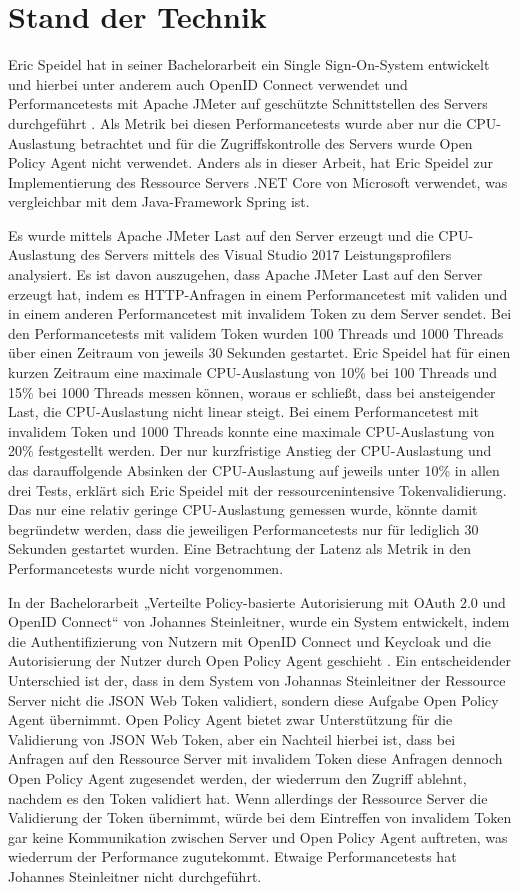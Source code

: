 \chapter{Stand der Technik}
Eric Speidel hat in seiner Bachelorarbeit ein Single Sign-On-System entwickelt und hierbei unter anderem auch OpenID Connect verwendet und Performancetests mit Apache JMeter auf geschützte Schnittstellen des Servers durchgeführt \citep{speidel:2017}. Als Metrik bei diesen Performancetests wurde aber nur die CPU-Auslastung betrachtet und für die Zugriffskontrolle des Servers wurde Open Policy Agent nicht verwendet. Anders als in dieser Arbeit, hat Eric Speidel zur Implementierung des Ressource Servers .NET Core von Microsoft verwendet, was vergleichbar mit dem Java-Framework Spring ist.\smallskip

Es wurde mittels Apache JMeter Last auf den Server erzeugt und die CPU-Auslastung des Servers mittels des Visual Studio 2017 Leistungsprofilers analysiert. Es ist davon auszugehen, dass Apache JMeter Last auf den Server erzeugt hat, indem es HTTP-Anfragen in einem Performancetest mit validen und in einem anderen Performancetest mit invalidem Token zu dem Server sendet. Bei den Performancetests mit validem Token wurden 100 Threads und 1000 Threads über einen Zeitraum von jeweils 30 Sekunden gestartet. Eric Speidel hat für einen kurzen Zeitraum eine maximale CPU-Auslastung von 10\% bei 100 Threads und 15\% bei 1000 Threads messen können, woraus er schließt, dass bei ansteigender Last, die CPU-Auslastung nicht linear steigt. Bei einem Performancetest mit invalidem Token und 1000 Threads konnte eine maximale CPU-Auslastung von 20\% festgestellt werden. Der nur kurzfristige Anstieg der CPU-Auslastung und das darauffolgende Absinken der CPU-Auslastung auf jeweils unter 10\% in allen drei Tests, erklärt sich Eric Speidel mit der ressourcenintensive Tokenvalidierung. Das nur eine relativ geringe CPU-Auslastung gemessen wurde, könnte damit begründetw werden, dass die jeweiligen Performancetests nur für lediglich 30 Sekunden gestartet wurden. Eine Betrachtung der Latenz als Metrik in den Performancetests wurde nicht vorgenommen.\bigskip

In der Bachelorarbeit „Verteilte Policy-basierte Autorisierung mit OAuth 2.0 und OpenID Connect“ von Johannes Steinleitner, wurde ein System entwickelt, indem die Authentifizierung von Nutzern mit OpenID Connect und Keycloak und die Autorisierung der Nutzer durch Open Policy Agent geschieht \citep{steinleitner:2020}. Ein entscheidender Unterschied ist der, dass in dem System von Johannas Steinleitner der Ressource Server nicht die JSON Web Token validiert, sondern diese Aufgabe Open Policy Agent übernimmt. Open Policy Agent bietet zwar Unterstützung für die Validierung von JSON Web Token, aber ein Nachteil hierbei ist, dass bei Anfragen auf den Ressource Server mit invalidem Token diese Anfragen dennoch Open Policy Agent zugesendet werden, der wiederrum den Zugriff ablehnt, nachdem es den Token validiert hat. Wenn allerdings der Ressource Server die Validierung der Token übernimmt, würde bei dem Eintreffen von invalidem Token gar keine Kommunikation zwischen Server und Open Policy Agent auftreten, was wiederrum der Performance zugutekommt. Etwaige Performancetests hat Johannes Steinleitner nicht durchgeführt.\bigskip

